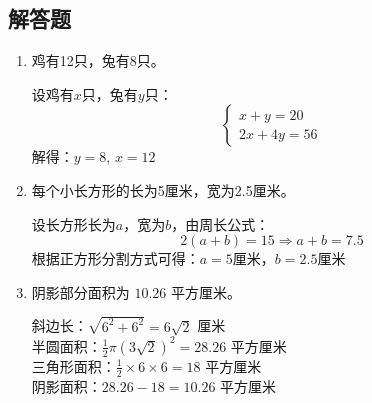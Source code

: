 \documentclass[12pt]{ctexart}
\begin{document}
\subsection*{解答题}
\begin{enumerate}[label=\arabic*., left=0pt]
\item 鸡有12只，兔有8只。
  
  设鸡有$x$只，兔有$y$只：
  \[
  \begin{cases}
  x + y = 20 \\
  2x + 4y = 56
  \end{cases}
  \]
  解得：$y=8$, $x=12$

\item 每个小长方形的长为5厘米，宽为2.5厘米。
  
  设长方形长为$a$，宽为$b$，由周长公式：
  \[
  2(a + b) = 15 \Rightarrow a + b = 7.5
  \]
  根据正方形分割方式可得：$a=5$厘米，$b=2.5$厘米

\item 阴影部分面积为 $10.26$ 平方厘米。
  
  斜边长：$\sqrt{6^2+6^2}=6\sqrt{2}$ 厘米 \\
  半圆面积：$\frac{1}{2} \pi (3\sqrt{2})^2 = 28.26$ 平方厘米 \\
  三角形面积：$\frac{1}{2} \times 6 \times 6 = 18$ 平方厘米 \\
  阴影面积：$28.26 - 18 = 10.26$ 平方厘米
\end{enumerate}
\end{document}
